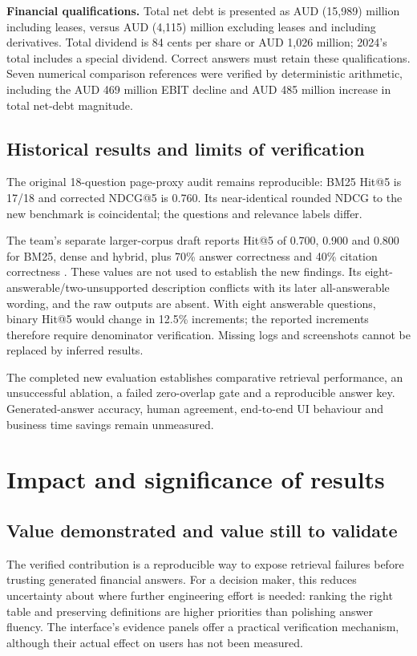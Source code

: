\documentclass[11pt,a4paper]{article}
\begin{document}
\textbf{Financial qualifications.} Total net debt is presented as AUD (15,989) million including leases, versus AUD (4,115) million excluding leases and including derivatives. Total dividend is 84 cents per share or AUD 1,026 million; 2024's total includes a special dividend. Correct answers must retain these qualifications. Seven numerical comparison references were verified by deterministic arithmetic, including the AUD 469 million EBIT decline and AUD 485 million increase in total net-debt magnitude.

\subsection{Historical results and limits of verification}
The original 18-question page-proxy audit remains reproducible: BM25 Hit@5 is 17/18 and corrected NDCG@5 is 0.760. Its near-identical rounded NDCG to the new benchmark is coincidental; the questions and relevance labels differ.

The team's separate larger-corpus draft reports Hit@5 of 0.700, 0.900 and 0.800 for BM25, dense and hybrid, plus 70\% answer correctness and 40\% citation correctness \cite{vijay}. These values are not used to establish the new findings. Its eight-answerable/two-unsupported description conflicts with its later all-answerable wording, and the raw outputs are absent. With eight answerable questions, binary Hit@5 would change in 12.5\% increments; the reported increments therefore require denominator verification. Missing logs and screenshots cannot be replaced by inferred results.

The completed new evaluation establishes comparative retrieval performance, an unsuccessful ablation, a failed zero-overlap gate and a reproducible answer key. Generated-answer accuracy, human agreement, end-to-end UI behaviour and business time savings remain unmeasured.

\section{Impact and significance of results}
\subsection{Value demonstrated and value still to validate}
The verified contribution is a reproducible way to expose retrieval failures before trusting generated financial answers. For a decision maker, this reduces uncertainty about where further engineering effort is needed: ranking the right table and preserving definitions are higher priorities than polishing answer fluency. The interface's evidence panels offer a practical verification mechanism, although their actual effect on users has not been measured.
\end{document}
